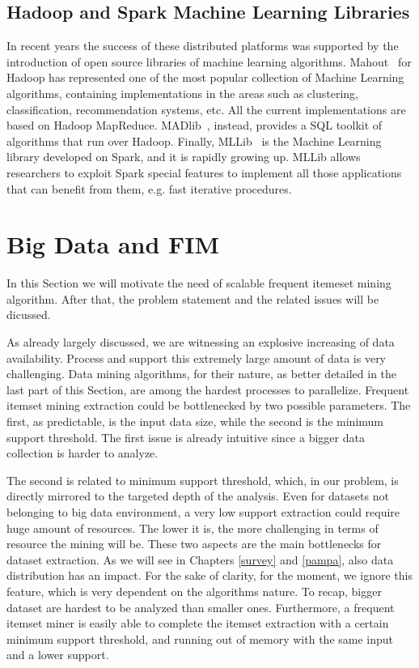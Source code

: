 \subsection{Hadoop and Spark Machine Learning Libraries}
In recent years the
success of these distributed platforms was supported by the introduction of open
source libraries of machine learning algorithms.
Mahout~\cite{Mahout} for Hadoop has represented one of the most popular
collection of Machine Learning algorithms, containing implementations in the
areas such as clustering, classification, recommendation systems, etc. All the
current implementations are based on Hadoop MapReduce.
MADlib~\cite{madlib},
instead, provides a SQL toolkit of algorithms that run over Hadoop. Finally,
MLLib~\cite{MLLib} is the Machine Learning library developed on Spark, and it is
rapidly growing up. MLLib allows researchers to exploit Spark special features
to implement all those applications that can benefit from them, e.g. fast
iterative procedures.

\section{Big Data and FIM}
In this Section we will motivate the need of scalable frequent itemeset mining algorithm. After that, the problem statement and the related issues will be dicussed.

As already largely discussed, we are witnessing an explosive increasing of data availability. Process and support this extremely large amount of data is very challenging. Data mining algorithms, for their nature, as better detailed in the last part of this Section, are among the hardest processes to parallelize.
Frequent itemset mining extraction could be bottlenecked by two possible parameters. The first, as predictable, is the input data size, while the second is the minimum support threshold. The first issue is already intuitive since a bigger data collection is harder to analyze.

The second is related to minimum support threshold, which, in our problem, is directly mirrored to the targeted depth of the analysis. 
Even for datasets not belonging to big data environment, a very low support 
extraction could require huge amount of resources. 
The lower it is, the more challenging in terms of resource the mining will be. These two aspects are the main bottlenecks for dataset extraction. As we will see in Chapters \ref{survey} and \ref{pampa}, also data distribution has an impact. For the sake of clarity, for the moment, we ignore this feature, which is very dependent on the algorithms nature. 
To recap, bigger dataset are hardest to be analyzed than smaller ones. Furthermore, a frequent itemset miner is easily able to complete the itemset extraction with a certain minimum support threshold, and running out of memory with the same input and a lower support. 


